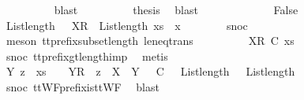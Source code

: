 \begin{isabellebody}
\ \ \ \ \ \ \ \ \isamarkupfalse%
\ blast\isanewline
\ \ \ \ \ \ \isamarkupfalse%
\ \isamarkupfalse%
\ {\isacharquery}thesis\ \isamarkupfalse%
\ blast\isanewline
\ \ \ \ \isamarkupfalse%
\isanewline
\ \ \isamarkupfalse%
\isanewline
\ \ \ \ \isamarkupfalse%
\ False\isanewline
\ \ \ \ \isamarkupfalse%
\ \isamarkupfalse%
\ {\isachardoublequoteopen}List{\isachardot}length\ {\isacharparenleft}{\isasymrho}\ {\isacharat}\ {\isacharbrackleft}{\isacharbrackleft}X{\isacharbrackright}\isactrlsub R{\isacharbrackright}{\isacharparenright}\ {\isacharless}\ List{\isachardot}length\ {\isacharparenleft}xs\ {\isacharat}\ {\isacharbrackleft}x{\isacharbrackright}{\isacharparenright}{\isachardoublequoteclose}\isanewline
\ \ \ \ \ \ \isamarkupfalse%
\ snoc\ \isanewline
\ \ \ \ \ \ \isamarkupfalse%
\ {\isacharparenleft}meson\ tt{\isacharunderscore}prefix{\isacharunderscore}subset{\isacharunderscore}length\ le{\isacharunderscore}neq{\isacharunderscore}trans{\isacharparenright}\isanewline
\ \ \ \ \isamarkupfalse%
\ \isamarkupfalse%
\ {\isachardoublequoteopen}{\isasymrho}\ {\isacharat}\ {\isacharbrackleft}{\isacharbrackleft}X{\isacharbrackright}\isactrlsub R{\isacharbrackright}\ {\isasymlesssim}\isactrlsub C\ xs{\isachardoublequoteclose}\isanewline
\ \ \ \ \ \ \isamarkupfalse%
\ snoc\ tt{\isacharunderscore}prefix{\isacharunderscore}gt{\isacharunderscore}length{\isacharunderscore}imp\ \isamarkupfalse%
\ metis\isanewline
\ \ \ \ \isamarkupfalse%
\ \isamarkupfalse%
\ {\isachardoublequoteopen}{\isasymexists}Y\ z\ {\isasymrho}\ xs\ {\isacharequal}\ {\isasymrho}\ {\isacharat}\ {\isacharbrackleft}{\isacharbrackleft}Y{\isacharbrackright}\isactrlsub R{\isacharbrackright}\ {\isacharat}\ z\ {\isasymand}\ X\ {\isasymsubseteq}\ Y\ {\isasymand}\ {\isasymrho}\ {\isasymlesssim}\isactrlsub C\ {\isasymrho}\ {\isasymand}\ List{\isachardot}length\ {\isasymrho}\ {\isacharequal}\ List{\isachardot}length\ {\isasymrho}{\isachardoublequoteclose}\isanewline
\ \ \ \ \ \ \isamarkupfalse%
\ snoc\ ttWF{\isacharunderscore}prefix{\isacharunderscore}is{\isacharunderscore}ttWF\ \isamarkupfalse%
\ blast\isanewline
\ \ \ \ \isamarkupfalse%
\ \isamarkupfalse%

\end{isabellebody}

